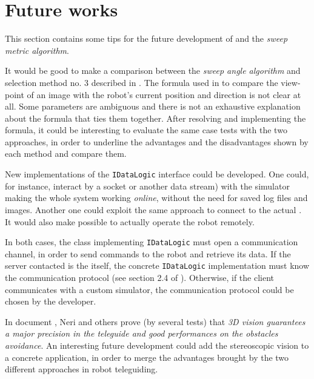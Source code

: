 \setcounter{figure}{0}
\setcounter{table}{0}
\setcounter{lstlisting}{0}

\chapter{Future works}
\label{future_works}
\minitoc

%
This section contains some tips for the future development of 
\framework{} and the \textit{sweep metric algorithm}.
%

%
It would be good to make a comparison between the \textit{sweep angle
algorithm} and selection method no. 3 described in \cite{sugimoto}.
%
The formula used in \cite{sugimoto} to compare the view-point of an image with
the robot's current position and direction is not clear at all. Some parameters
are ambiguous and there is not an exhaustive explanation about the formula that
ties them together.
%
After resolving and implementing the formula, it could be interesting to evaluate
the same case tests with the two approaches, in order to underline the advantages
and the disadvantages shown by each method and compare them.
%

%
New implementations of the \texttt{IDataLogic} interface could be 
developed. One could, for instance, interact by a socket or another 
data stream) with the simulator making the whole system working \textit{online}, 
without the need for saved log files and images. Another one could exploit the 
same approach to connect to the actual \morduc{}. It would also make possible 
to actually operate the robot remotely.
%

%
In both cases, the class implementing \texttt{IDataLogic} must open a communication
channel, in order to send commands to the robot and retrieve its data.
%
If the server contacted is the \morduc{} itself, the concrete \texttt{IDataLogic} 
implementation must know the \morduc{} communication protocol (see section 2.4 of 
\cite{morduc:dasero}). Otherwise, if the client communicates with a custom 
simulator, the communication protocol could be chosen by the developer.
%

%
In document \cite{morduc:neri}, Neri and others prove (by several tests) that \textit{3D
vision guarantees a major precision in the teleguide and good performances on the obstacles
avoidance}. An interesting future development could add the stereoscopic vision to a concrete
\framework{} application, in order to merge the advantages brought by the two different
approaches in robot teleguiding.
%

